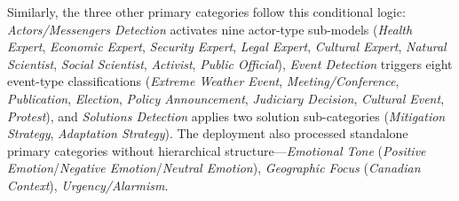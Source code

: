 \documentclass[12pt]{article}
\begin{document}
Similarly, the three other primary categories follow this conditional logic: \emph{Actors/Messengers Detection} activates nine actor-type sub-models (\emph{Health Expert}, \emph{Economic Expert}, \emph{Security Expert}, \emph{Legal Expert}, \emph{Cultural Expert}, \emph{Natural Scientist}, \emph{Social Scientist}, \emph{Activist}, \emph{Public Official}), \emph{Event Detection} triggers eight event-type classifications (\emph{Extreme Weather Event}, \emph{Meeting/Conference}, \emph{Publication}, \emph{Election}, \emph{Policy Announcement}, \emph{Judiciary Decision}, \emph{Cultural Event}, \emph{Protest}), and \emph{Solutions Detection} applies two solution sub-categories (\emph{Mitigation Strategy}, \emph{Adaptation Strategy}). The deployment also processed standalone primary categories without hierarchical structure—\emph{Emotional Tone} (\emph{Positive Emotion}/\emph{Negative Emotion}/\emph{Neutral Emotion}), \emph{Geographic Focus} (\emph{Canadian Context}), \emph{Urgency/Alarmism}. 
\end{document}
